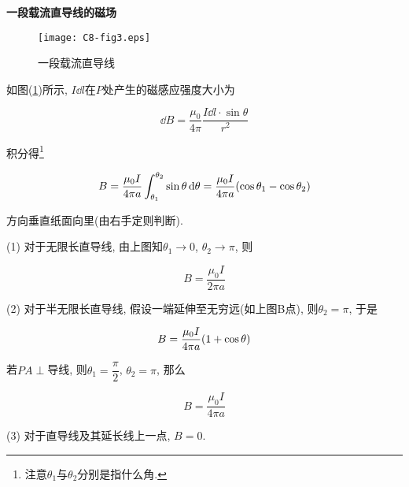\begin{example}
	\textbf{一段载流直导线的磁场}
	
	\begin{figure}[H]
		\centering
		\texttt{[image: C8-fig3.eps]}
		\caption{一段载流直导线}
		\label{C8-fig3}
	\end{figure}
	
	\begin{solution}
		
		如图(\ref{C8-fig3})所示, $I\dd{l}$在$P$处产生的磁感应强度大小为
		
		\begin{equation*}
			\dd{B} = \dfrac{\mu_0}{4 \pi} \dfrac{I \dd{l} \cdot \sin \theta}{r^2}
		\end{equation*}
	
		积分得\footnote{注意$\theta_1$与$\theta_2$分别是指什么角. }
		
		\begin{equation*}
			B = \dfrac{\mu_0 I}{4 \pi a} \int_{\theta_1}^{\theta_2} \sin \theta \dd{\theta} = \dfrac{\mu_0 I}{4 \pi a} \qty(\cos \theta_1 - \cos \theta_2)
		\end{equation*}
		
		方向垂直纸面向里(由右手定则判断).
		
	\end{solution}
	
\end{example}

\begin{note}
	
	(1) 对于无限长直导线, 由上图知$\theta_1 \to 0$, $\theta_2 \to \pi$, 则
	
	\begin{equation*}
		B = \dfrac{\mu_0 I}{2 \pi a}
	\end{equation*}
	
	(2) 对于半无限长直导线, 假设一端延伸至无穷远(如上图B点), 则$\theta_2 = \pi$, 于是
	
	\begin{equation*}
		B = \dfrac{\mu_0 I}{4 \pi a} \qty(1 + \cos \theta) 
	\end{equation*}
		
	若$PA \perp$导线, 则$\theta_1 = \dfrac{\pi}{2}$, $\theta_2 = \pi$, 那么
	
	\begin{equation*}
		B = \dfrac{\mu_0 I}{4 \pi a}
	\end{equation*}
	
	(3) 对于直导线及其延长线上一点, $B = 0$.
	
\end{note}

